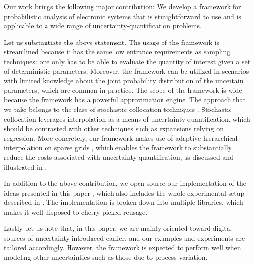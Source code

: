Our work brings the following major contribution: We develop a framework for
probabilistic analysis of electronic systems that is straightforward to use and
is applicable to a wide range of uncertainty-quantification problems.

Let us substantiate the above statement. The usage of the framework is
streamlined because it has the same low entrance requirements as sampling
techniques: one only has to be able to evaluate the quantity of interest given a
set of deterministic parameters. Moreover, the framework can be utilized in
scenarios with limited knowledge about the joint probability distribution of the
uncertain parameters, which are common in practice. The scope of the framework
is wide because the framework has a powerful approximation engine. The approach
that we take belongs to the class of stochastic collocation techniques
\cite{xiu2010}. Stochastic collocation leverages interpolation as a means of
uncertainty quantification, which should be contrasted with other techniques
such as  expansions relying on regression. More concretely, our framework
makes use of adaptive hierarchical interpolation on sparse grids
\cite{jakeman2012, klimke2006, ma2009}, which enables the framework to
substantially reduce the costs associated with uncertainty quantification, as
discussed and illustrated in .

In addition to the above contribution, we open-source our implementation of the
ideas presented in this paper \cite{sources}, which also includes the whole
experimental setup described in . The implementation is
broken down into multiple libraries, which makes it well disposed to
cherry-picked reusage.

Lastly, let us note that, in this paper, we are mainly oriented toward digital
sources of uncertainty introduced earlier, and our examples and experiments are
tailored accordingly. However, the framework is expected to perform well when
modeling other uncertainties such as those due to process variation.

